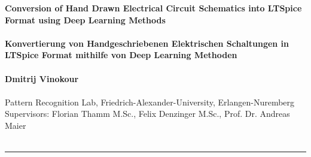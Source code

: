 \documentclass{article} %
\begin{document}
\begin{center}

\textbf{
\huge{Conversion of Hand Drawn Electrical Circuit Schematics into LTSpice Format using Deep Learning Methods}
\\~\\
\large{Konvertierung von Handgeschriebenen Elektrischen Schaltungen in LTSpice Format mithilfe von Deep Learning Methoden}
\\~\\
Dmitrij Vinokour
\\~\\
}
Pattern Recognition Lab, Friedrich-Alexander-University, Erlangen-Nuremberg
\\
Supervisors: Florian Thamm M.Sc., Felix Denzinger M.Sc., Prof. Dr. Andreas Maier
\\~\\
\noindent\rule{\textwidth}{1pt}
\end{center}
\end{document}
